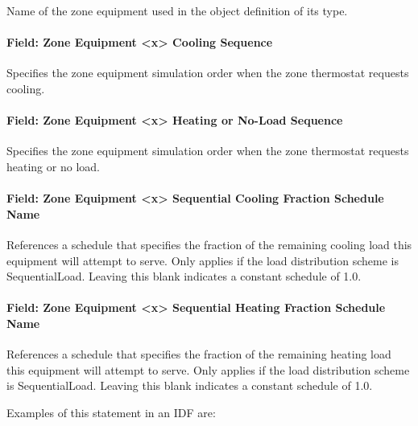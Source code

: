 Name of the zone equipment used in the object definition of its type.

\paragraph{Field: Zone Equipment \textless{}x\textgreater{} Cooling Sequence}\label{field-zone-equipment-x-cooling-sequence}

Specifies the zone equipment simulation order when the zone thermostat requests cooling.

\paragraph{Field: Zone Equipment \textless{}x\textgreater{} Heating or No-Load Sequence}\label{field-zone-equipment-x-heating-or-no-load-sequence}

Specifies the zone equipment simulation order when the zone thermostat requests heating or no load.

\paragraph{Field: Zone Equipment \textless{}x\textgreater{} Sequential Cooling Fraction Schedule Name}\label{field-zone-equipment-x-sequential-cooling-fraction}

References a schedule that specifies the fraction of the remaining cooling load this equipment will attempt to serve. Only applies if the load distribution scheme is SequentialLoad. Leaving this blank indicates a constant schedule of 1.0.

\paragraph{Field: Zone Equipment \textless{}x\textgreater{} Sequential Heating Fraction Schedule Name}\label{field-zone-equipment-x-sequential-heating-fraction}

References a schedule that specifies the fraction of the remaining heating load this equipment will attempt to serve. Only applies if the load distribution scheme is SequentialLoad. Leaving this blank indicates a constant schedule of 1.0.

Examples of this statement in an IDF are:

